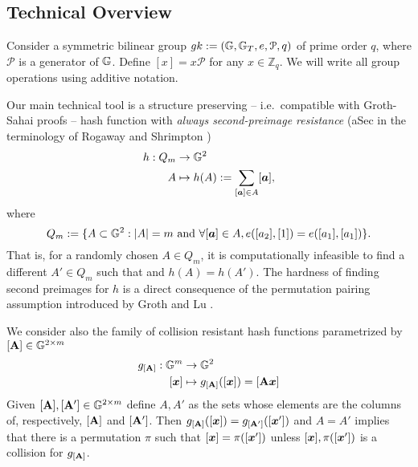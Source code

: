 
%

\subsection{Technical Overview}
Consider a symmetric bilinear group $gk:=(\mathbb{G},\mathbb{G}_T,e,\mathcal{P},q)$ of prime order $q$, where $\mathcal{P}$ is a generator of $\mathbb{G}$. Define $[x]=x\mathcal{P}$ for any $x\in\mathbb{Z}_q$.  We will write all group operations using additive notation.

Our main technical tool is a structure preserving -- i.e.~compatible with Groth-Sahai proofs -- hash function with \emph{always second-preimage resistance} (aSec in the terminology of Rogaway and Shrimpton \cite{FSE:RogShr04})
\begin{align*}
h : Q_m &\to \mathbb{G}^2\\
      A &\mapsto h(A) := \sum_{[{\boldsymbol{a}}]\in A} [{\boldsymbol{a}}],
\end{align*}
 where
$$
Q_m:= \{A\subset\mathbb{G}^2: |A|=m \text{ and }\forall [{\boldsymbol{a}}]\in A, e([a_2],[1])=e([a_1],[a_1])\}.
$$
That is, for a randomly chosen $A\in Q_m$, it is computationally infeasible to find a different $A'\in Q_m$ such that and $h(A)=h(A')$. The hardness of finding second preimages for $h$ is a direct consequence of the permutation pairing assumption introduced by Groth and Lu \cite{AC:GroLu07}.

We consider also the family of collision resistant hash functions parametrized by $[\mathbf{{A}}]\in\mathbb{G}^{2\times m}$
\begin{align*}
g_{[\matr{A}]} : \GG^m &\to \GG^2\\
           [\vecb{x}] &\mapsto g_{[\matr{A}]}([\vecb{x}]) = [\matr{A}\vecb{x}]
\end{align*}
Given $[\mathbf{{A}}],[\mathbf{{A}}']\in\mathbb{G}^{2\times m}$ define $A,A'$ as the sets whose elements are the columns of, respectively, $[\mathbf{{A}}]$ and $[\mathbf{{A}}']$. Then $g_{[\mathbf{{A}}]}([{\boldsymbol{x}}]) = g_{[\mathbf{{A}}']}([{\boldsymbol{x}}'])$ and $A=A'$ implies that there is a permutation $\pi$ such that $[{\boldsymbol{x}}]=\pi([{\boldsymbol{x}}'])$ unless $[{\boldsymbol{x}}],\pi([{\boldsymbol{x}}'])$ is a collision for $g_{[\mathbf{{A}}]}$.
 

